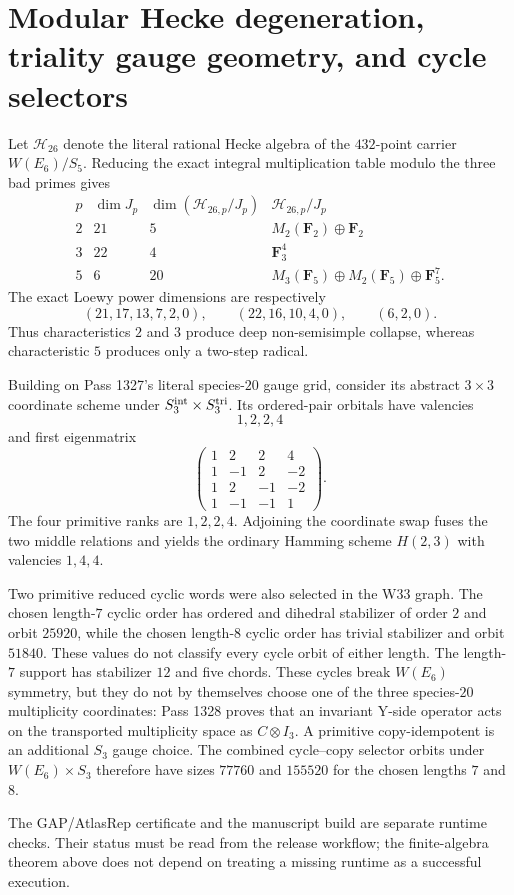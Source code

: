 \section{Modular Hecke degeneration, triality gauge geometry, and cycle selectors}
\label{sec:pass1330-1334}

Let $\mathcal H_{26}$ denote the literal rational Hecke algebra of the
$432$-point carrier $W(E_6)/S_5$.  Reducing the exact integral
multiplication table modulo the three bad primes gives
\[
\begin{array}{c|c|c|c}
p&\dim J_p&\dim(\mathcal H_{26,p}/J_p)&
\mathcal H_{26,p}/J_p\\ \hline
2&21&5&M_2(\mathbf F_2)\oplus\mathbf F_2\\
3&22&4&\mathbf F_3^4\\
5&6&20&M_3(\mathbf F_5)\oplus M_2(\mathbf F_5)\oplus\mathbf F_5^7.
\end{array}
\]
The exact Loewy power dimensions are respectively
\[
(21,17,13,7,2,0),\qquad (22,16,10,4,0),\qquad (6,2,0).
\]
Thus characteristics $2$ and $3$ produce deep non-semisimple collapse,
whereas characteristic $5$ produces only a two-step radical.

Building on Pass 1327's literal species-$20$ gauge grid, consider its abstract
$3\times3$ coordinate scheme under
$S_3^{\rm int}\times S_3^{\rm tri}$. Its ordered-pair orbitals have
valencies
\[
1,2,2,4
\]
and first eigenmatrix
\[
\left(\begin{array}{rrrr}
1&2&2&4\\
1&-1&2&-2\\
1&2&-1&-2\\
1&-1&-1&1
\end{array}\right).
\]
The four primitive ranks are $1,2,2,4$.  Adjoining the coordinate swap
fuses the two middle relations and yields the ordinary Hamming scheme
$H(2,3)$ with valencies $1,4,4$.

Two primitive reduced cyclic words were also selected in the W33 graph.
The chosen length-$7$ cyclic order has ordered and dihedral stabilizer of
order $2$ and orbit $25920$, while the chosen length-$8$ cyclic order has
trivial stabilizer and orbit $51840$. These values do not classify every
cycle orbit of either length. The length-$7$ support has stabilizer $12$
and five chords. These cycles break $W(E_6)$ symmetry, but they do not by
themselves choose one of the three species-$20$ multiplicity coordinates:
Pass 1328 proves that an invariant Y-side operator acts on the transported
multiplicity space as $C\otimes I_3$. A primitive
copy-idempotent is an additional $S_3$ gauge choice.  The combined
cycle--copy selector orbits under $W(E_6)\times S_3$ therefore have sizes
$77760$ and $155520$ for the chosen lengths $7$ and $8$.

The GAP/AtlasRep certificate and the manuscript build are separate
runtime checks.  Their status must be read from the release workflow;
the finite-algebra theorem above does not depend on treating a missing
runtime as a successful execution.

